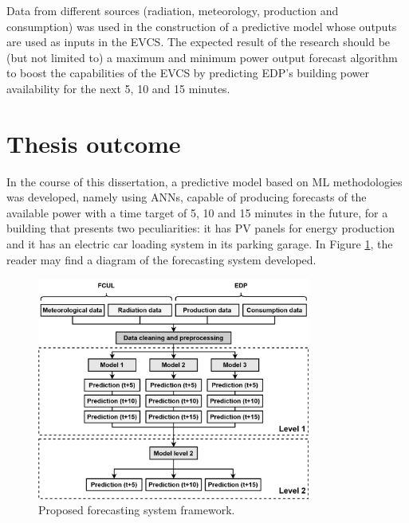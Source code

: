 Data from different sources (radiation, meteorology, production and consumption) was used in the construction of a predictive model whose outputs are used as inputs in the \ac{EVCS}. The expected result of the research should be (but not limited to) a maximum and minimum power output forecast algorithm to boost the capabilities of the \ac{EVCS} by predicting \ac{EDP}'s building power availability for the next 5, 10 and 15 minutes.

\section{Thesis outcome}

In the course of this dissertation, a predictive model based on \ac{ML} methodologies was developed, namely using \ac{ANN}s, capable of producing forecasts of the available power with a time target of 5, 10 and 15 minutes in the future, for a building that presents two peculiarities: it has \ac{PV} panels for energy production and it has an electric car loading system in its parking garage. In Figure \ref{scope}, the reader may find a diagram of the forecasting system developed.

\begin{figure}[h!]
    \centering
    \begin{center}
    \includegraphics[width=0.8\textwidth]{Images/Work1.png}
    \caption{Proposed forecasting system framework.}
    \label{scope}
    \end{center}
\end{figure}


